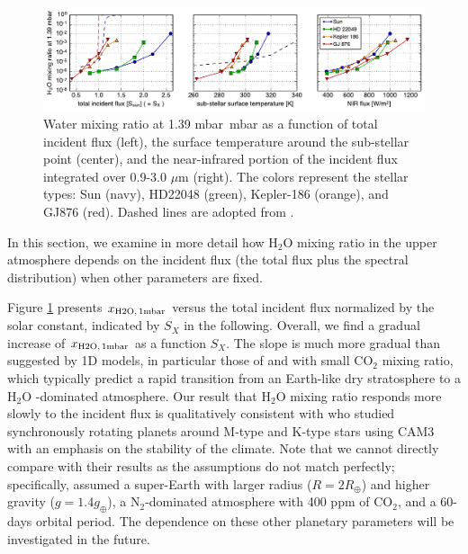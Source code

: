 \documentclass[11pt,numberedappendix,twocolappendix,]{emulateapj}
\def\water{H$_2$O }
\def\xwater{$x_{\rm H2O,\,1mbar}$ }
\def\preslevel{1.39 mbar\ }
\begin{document}
\begin{figure}[!tb]
    \begin{center}
    \includegraphics[width=\hsize]{fig/xH2O_3panels.pdf}
    \end{center}
\caption{Water mixing ratio at \preslevel mbar as a function of total incident flux (left), the surface temperature around the sub-stellar point (center), and the near-infrared portion of the incident flux integrated over 0.9-3.0 $\mu $m (right). The colors represent the stellar types: Sun (navy), HD22048 (green), Kepler-186 (orange), and GJ876 (red). Dashed lines are adopted from \citet{Kasting1993}. }                                                                                                             
\label{fig:xH2O_S0X}
\end{figure}

In this section, we examine in more detail how \water mixing ratio in the upper atmosphere depends on the incident flux (the total flux plus the spectral distribution) when other parameters are fixed. 

Figure \ref{fig:xH2O_S0X} presents \xwater versus the total incident flux normalized by the solar constant, indicated by $S_X$ in the following. 
Overall, we find a gradual increase of \xwater as a function $S_X$. 
The slope is much more gradual than suggested by 1D models, in particular those  of \citet{Kasting1993} and \citet{Wordsworth2013} with small CO$_2$ mixing ratio, which typically predict a rapid transition from an Earth-like dry stratosphere to a \water-dominated atmosphere. 
Our result that \water mixing ratio responds more slowly to the incident flux is qualitatively consistent with \citet{Yang2013} who studied synchronously rotating planets around M-type and K-type stars using CAM3 with an emphasis on the stability of the climate. 
Note that we cannot directly compare with their results as the assumptions do not match perfectly; specifically, \cite{Yang2013} assumed a super-Earth with larger radius ($R=2R_{\oplus}$) and higher gravity ($g=1.4g_{\oplus}$), a N$_2$-dominated atmosphere with 400 ppm of CO$_2$, and a 60-days orbital period. 
The dependence on these other planetary parameters will be investigated in the future. 
\end{document}
